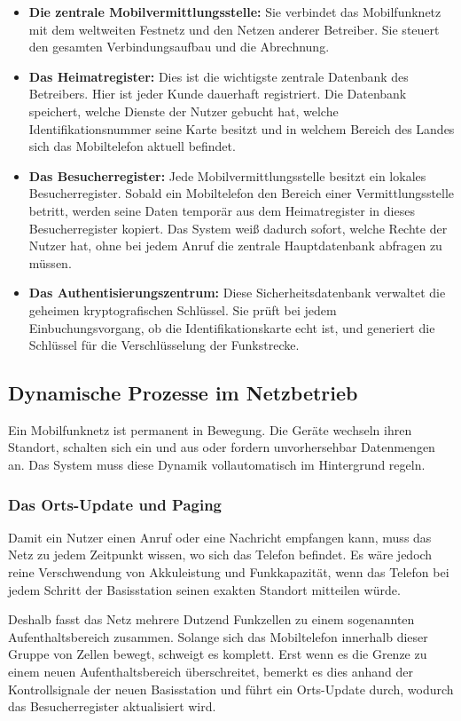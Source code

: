\documentclass[11pt,a4paper]{article}
\begin{document}
\begin{itemize}
    \item \textbf{Die zentrale Mobilvermittlungsstelle:} Sie verbindet das Mobilfunknetz mit dem weltweiten Festnetz und den Netzen anderer Betreiber. Sie steuert den gesamten Verbindungsaufbau und die Abrechnung.
    \item \textbf{Das Heimatregister:} Dies ist die wichtigste zentrale Datenbank des Betreibers. Hier ist jeder Kunde dauerhaft registriert. Die Datenbank speichert, welche Dienste der Nutzer gebucht hat, welche Identifikationsnummer seine Karte besitzt und in welchem Bereich des Landes sich das Mobiltelefon aktuell befindet.
    \item \textbf{Das Besucherregister:} Jede Mobilvermittlungsstelle besitzt ein lokales Besucherregister. Sobald ein Mobiltelefon den Bereich einer Vermittlungsstelle betritt, werden seine Daten temporär aus dem Heimatregister in dieses Besucherregister kopiert. Das System weiß dadurch sofort, welche Rechte der Nutzer hat, ohne bei jedem Anruf die zentrale Hauptdatenbank abfragen zu müssen.
    \item \textbf{Das Authentisierungszentrum:} Diese Sicherheitsdatenbank verwaltet die geheimen kryptografischen Schlüssel. Sie prüft bei jedem Einbuchungsvorgang, ob die Identifikationskarte echt ist, und generiert die Schlüssel für die Verschlüsselung der Funkstrecke.
\end{itemize}

\subsection{Dynamische Prozesse im Netzbetrieb}

Ein Mobilfunknetz ist permanent in Bewegung. Die Geräte wechseln ihren Standort, schalten sich ein und aus oder fordern unvorhersehbar Datenmengen an. Das System muss diese Dynamik vollautomatisch im Hintergrund regeln.

\subsubsection{Das Orts-Update und Paging}
Damit ein Nutzer einen Anruf oder eine Nachricht empfangen kann, muss das Netz zu jedem Zeitpunkt wissen, wo sich das Telefon befindet. Es wäre jedoch reine Verschwendung von Akkuleistung und Funkkapazität, wenn das Telefon bei jedem Schritt der Basisstation seinen exakten Standort mitteilen würde.

Deshalb fasst das Netz mehrere Dutzend Funkzellen zu einem sogenannten Aufenthaltsbereich zusammen. Solange sich das Mobiltelefon innerhalb dieser Gruppe von Zellen bewegt, schweigt es komplett. Erst wenn es die Grenze zu einem neuen Aufenthaltsbereich überschreitet, bemerkt es dies anhand der Kontrollsignale der neuen Basisstation und führt ein Orts-Update durch, wodurch das Besucherregister aktualisiert wird.
\end{document}

